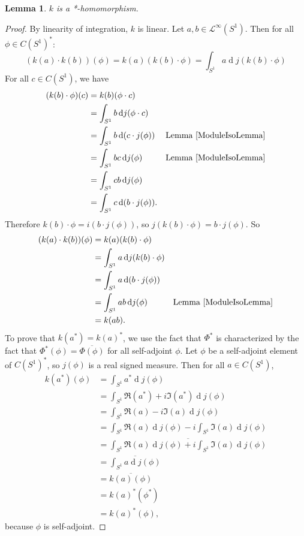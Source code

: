 \documentclass{article}
\newcommand{\Ell}{\mathcal{L}}
\renewcommand{\d}[1]{\operatorname{d}\!{#1}}
\newtheorem{lemma}[theorem]{Lemma}
\begin{document}
\begin{lemma}
\label{KHomomorphismLemma}
$k$ is a *-homomorphism.
\end{lemma}
\begin{proof}
By linearity of integration, $k$ is linear. Let $a,b \in \Ell^\infty(S^1)$. Then for all $\phi \in C(S^1)^*$:
\[
(k(a) \cdot k(b))(\phi) = k(a)(k(b) \cdot \phi) = \int_{S^1}a \d{j(k(b) \cdot \phi)}
\]
For all $c \in C(S^1)$, we have 
\begin{align*}
(k(b) \cdot \phi)(c) &= k(b)(\phi \cdot c) \\
 &= \int_{S^1}b \d{j(\phi \cdot c)} \\
 &= \int_{S^1}b \d{(c \cdot j(\phi))} & \text{Lemma \ref{ModuleIsoLemma}}\\
 &= \int_{S^1}b c \d{j(\phi)} & \text{Lemma \ref{ModuleIsoLemma}} \\
 &= \int_{S^1}cb \d{j(\phi)} \\
 &= \int_{S^1}c \d{(b \cdot j(\phi))}.
\end{align*}
Therefore $k(b) \cdot \phi = i(b \cdot j(\phi))$, so $j(k(b) \cdot \phi) = b \cdot j(\phi)$. So
\begin{align*}
(k(a) \cdot k(b))(\phi) &= k(a)(k(b) \cdot \phi) \\
 &= \int_{S^1}a \d{j(k(b) \cdot \phi)} \\
 &= \int_{S^1}a \d{(b \cdot j(\phi))} \\
 &= \int_{S^1}ab \d{j(\phi)} & \text{Lemma \ref{ModuleIsoLemma}} \\
 &= k(ab).
\end{align*}
To prove that $k(a^*) = k(a)^*$, we use the fact that $\Phi^*$ is characterized by the fact that $\Phi^*(\phi) = \overline{\Phi(\phi)}$ for all self-adjoint $\phi$. Let $\phi$ be a self-adjoint element of $C(S^1)^*$, so $j(\phi)$ is a real signed measure. Then for all $a \in C(S^1)$,
\begin{align*}
k(a^*)(\phi) &= \int_{S^1}a^* \d{j(\phi)} \\
 &= \int_{S^1}\Re(a^*) + i\Im(a^*) \d{j(\phi)} \\
 &= \int_{S^1}\Re(a) - i\Im(a) \d{j(\phi)} \\
 &= \int_{S^1}\Re(a)\d{j(\phi)} - i\int_{S^1}\Im(a)\d{j(\phi)} \\
 &= \overline{\int_{S^1}\Re(a)\d{j(\phi)} + i\int_{S^1}\Im(a)\d{j(\phi)}} \\
 &= \overline{\int_{S^1}a\d{j(\phi)}} \\
 &= \overline{k(a)(\phi)} \\
 &= k(a)^*(\phi^*) \\
 &= k(a)^*(\phi),
\end{align*}
because $\phi$ is self-adjoint. 
\end{proof}
\end{document}
